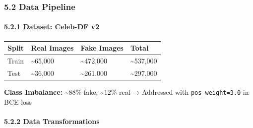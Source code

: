 \subsubsection{5.2 Data Pipeline}\label{data-pipeline}

\paragraph{5.2.1 Dataset: Celeb-DF v2}\label{dataset-celeb-df-v2}

\begin{longtable}[]{@{}llll@{}}
\toprule\noalign{}
Split & Real Images & Fake Images & Total \\
\midrule\noalign{}
\endhead
\bottomrule\noalign{}
\endlastfoot
Train & \textasciitilde65,000 & \textasciitilde472,000 &
\textasciitilde537,000 \\
Test & \textasciitilde36,000 & \textasciitilde261,000 &
\textasciitilde297,000 \\
\end{longtable}

\textbf{Class Imbalance:} \textasciitilde88\% fake, \textasciitilde12\%
real → Addressed with \texttt{pos\_weight=3.0} in BCE loss

\paragraph{5.2.2 Data Transformations}\label{data-transformations}


